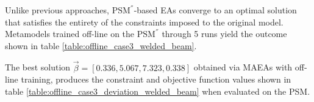 \begin{table}[h!]
\centering
\caption{\textbf{C}, \textbf{F} responses to $\vec{β}$ found 
via EAs using the $\mathrm{PSM}^{''}$}
\label{table:offline_case3_PSM_welded_beam}
\end{table}

\newpage


Unlike previous approaches, $\mathrm{PSM}^{''}$-based EAs 
converge to an optimal solution that satisfies the entirety 
of the constraints imposed to the original model. Metamodels 
trained off-line on the $\mathrm{PSM}^{''}$ through 5 runs yield 
the outcome shown in table 
\ref{table:offline_case3_welded_beam}.

\begin{table}[h!]
\centering
\caption{Optimization of welded beam design using MAEAs with 
off-line training}
\label{table:offline_case3_welded_beam}
\end{table}

The best solution $\vec{β} = [0.336, 5.067, 7.323, 0.338]$ obtained 
via MAEAs with off-line training, produces the constraint and 
objective function values shown in table 
\ref{table:offline_case3_deviation_welded_beam} when evaluated on 
the PSM.

